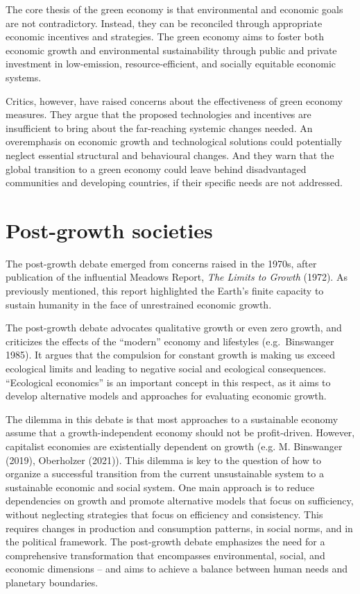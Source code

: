 \documentclass[
  a4paper,
  openany]{book}
\begin{document}
The core thesis of the green economy is that environmental and economic
goals are not contradictory. Instead, they can be reconciled through
appropriate economic incentives and strategies. The green economy aims
to foster both economic growth and environmental sustainability through
public and private investment in low-emission, resource-efficient, and
socially equitable economic systems.

Critics, however, have raised concerns about the effectiveness of green
economy measures. They argue that the proposed technologies and
incentives are insufficient to bring about the far-reaching systemic
changes needed. An overemphasis on economic growth and technological
solutions could potentially neglect essential structural and behavioural
changes. And they warn that the global transition to a green economy
could leave behind disadvantaged communities and developing countries,
if their specific needs are not addressed.

\section{Post-growth societies}\label{post-growth-societies}

The post-growth debate emerged from concerns raised in the 1970s, after
publication of the influential Meadows Report, \emph{The Limits to
Growth} (1972). As previously mentioned, this report highlighted the
Earth's finite capacity to sustain humanity in the face of unrestrained
economic growth.

The post-growth debate advocates qualitative growth or even zero growth,
and criticizes the effects of the ``modern'' economy and lifestyles
(e.g.~Binswanger 1985). It argues that the compulsion for constant
growth is making us exceed ecological limits and leading to negative
social and ecological consequences. ``Ecological economics'' is an
important concept in this respect, as it aims to develop alternative
models and approaches for evaluating economic growth.

The dilemma in this debate is that most approaches to a sustainable
economy assume that a growth-independent economy should not be
profit-driven. However, capitalist economies are existentially dependent
on growth (e.g. M. Binswanger (2019), Oberholzer (2021)). This dilemma
is key to the question of how to organize a successful transition from
the current unsustainable system to a sustainable economic and social
system. One main approach is to reduce dependencies on growth and
promote alternative models that focus on sufficiency, without neglecting
strategies that focus on efficiency and consistency. This requires
changes in production and consumption patterns, in social norms, and in
the political framework. The post-growth debate emphasizes the need for
a comprehensive transformation that encompasses environmental, social,
and economic dimensions -- and aims to achieve a balance between human
needs and planetary boundaries.
\end{document}
